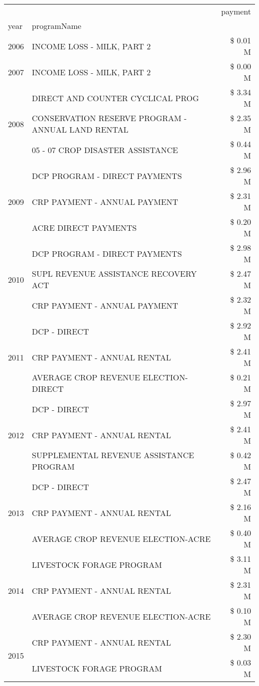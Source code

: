 \begin{tabular}{llr}
\toprule
 &  & payment \\
year & programName &  \\
\midrule
2006 & INCOME LOSS - MILK, PART 2 & \$ 0.01 M \\
\cline{1-3}
2007 & INCOME LOSS - MILK, PART 2 & \$ 0.00 M \\
\cline{1-3}
\multirow[t]{3}{*}{2008} & DIRECT AND COUNTER CYCLICAL PROG & \$ 3.34 M \\
 & CONSERVATION RESERVE PROGRAM - ANNUAL LAND RENTAL & \$ 2.35 M \\
 & 05 - 07 CROP DISASTER ASSISTANCE & \$ 0.44 M \\
\cline{1-3}
\multirow[t]{3}{*}{2009} & DCP PROGRAM - DIRECT PAYMENTS & \$ 2.96 M \\
 & CRP PAYMENT - ANNUAL PAYMENT & \$ 2.31 M \\
 & ACRE DIRECT PAYMENTS & \$ 0.20 M \\
\cline{1-3}
\multirow[t]{3}{*}{2010} & DCP PROGRAM - DIRECT PAYMENTS & \$ 2.98 M \\
 & SUPL REVENUE ASSISTANCE RECOVERY ACT & \$ 2.47 M \\
 & CRP PAYMENT - ANNUAL PAYMENT & \$ 2.32 M \\
\cline{1-3}
\multirow[t]{3}{*}{2011} & DCP - DIRECT & \$ 2.92 M \\
 & CRP PAYMENT - ANNUAL RENTAL & \$ 2.41 M \\
 & AVERAGE CROP REVENUE ELECTION-DIRECT & \$ 0.21 M \\
\cline{1-3}
\multirow[t]{3}{*}{2012} & DCP - DIRECT & \$ 2.97 M \\
 & CRP PAYMENT - ANNUAL RENTAL & \$ 2.41 M \\
 & SUPPLEMENTAL REVENUE ASSISTANCE PROGRAM & \$ 0.42 M \\
\cline{1-3}
\multirow[t]{3}{*}{2013} & DCP - DIRECT & \$ 2.47 M \\
 & CRP PAYMENT - ANNUAL RENTAL & \$ 2.16 M \\
 & AVERAGE CROP REVENUE ELECTION-ACRE & \$ 0.40 M \\
\cline{1-3}
\multirow[t]{3}{*}{2014} & LIVESTOCK FORAGE PROGRAM & \$ 3.11 M \\
 & CRP PAYMENT - ANNUAL RENTAL & \$ 2.31 M \\
 & AVERAGE CROP REVENUE ELECTION-ACRE & \$ 0.10 M \\
\cline{1-3}
\multirow[t]{3}{*}{2015} & CRP PAYMENT - ANNUAL RENTAL & \$ 2.30 M \\
 & LIVESTOCK FORAGE PROGRAM & \$ 0.03 M \\

\end{tabular}

